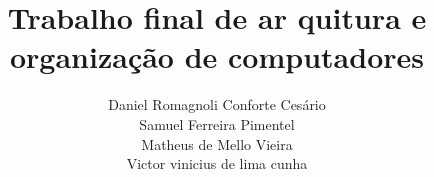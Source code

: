 \documentclass{article}
\title{Trabalho final de ar quitura e organização de computadores}
\author{Daniel Romagnoli Conforte Cesário\\Samuel Ferreira Pimentel\\Matheus de Mello Vieira\\Victor vinicius de lima cunha}
\begin{document}
	
	\thispagestyle{empty}
	\maketitle
	\newpage
	\tableofcontents
	\newpage
	
	
	
	
	
	
	
	
	
	\nocite{edson}
	\nocite{manual_intel}
	\nocite{patterson}
	\nocite{pdf_estranho}
	
	\newpage
	
	
\end{document}
